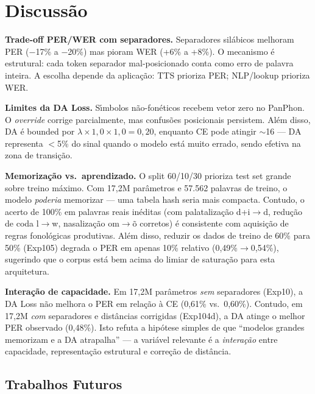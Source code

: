\documentclass[12pt]{article}
\begin{document}
\section{Discuss\~ao}

\textbf{Trade-off PER/WER com separadores.}
Separadores sil\'abicos melhoram PER ($-$17\% a $-$20\%) mas pioram WER
(+6\% a +8\%). O mecanismo \'e estrutural: cada token separador
mal-posicionado conta como erro de palavra inteira. A escolha depende da
aplica\c{c}\~ao: TTS prioriza PER; NLP/lookup prioriza WER.

\textbf{Limites da DA Loss.}
S\'{\i}mbolos n\~ao-fon\'eticos recebem vetor zero no PanPhon. O
\emph{override} corrige parcialmente, mas confus\~oes posicionais
persistem. Al\'em disso, DA \'e bounded por $\lambda \times 1{,}0 \times
1{,}0 = 0{,}20$, enquanto CE pode atingir ${\sim}$16 --- DA representa
$<$5\% do sinal quando o modelo est\'a muito errado, sendo efetiva na
zona de transi\c{c}\~ao.

\textbf{Memoriza\c{c}\~ao vs.\ aprendizado.}
O split 60/10/30 prioriza test set grande sobre treino m\'aximo.
Com 17,2M par\^ametros e 57.562 palavras de treino, o modelo
\emph{poderia} memorizar --- uma tabela hash seria mais compacta.
Contudo, o acerto de 100\% em palavras reais in\'editas (com
palataliza\c{c}\~ao d+i$\to$d, redu\c{c}\~ao de coda
l$\to$w, nasaliza\c{c}\~ao om$\to$\~{o} corretos) \'e consistente
com aquisi\c{c}\~ao de regras fonol\'ogicas produtivas.
Al\'em disso, reduzir os dados de treino de 60\% para 50\% (Exp105)
degrada o PER em apenas 10\% relativo (0,49\%$\to$0,54\%), sugerindo
que o corpus est\'a bem acima do limiar de satura\c{c}\~ao para esta
arquitetura.

\textbf{Intera\c{c}\~ao de capacidade.}
Em 17,2M par\^ametros \emph{sem} separadores (Exp10), a DA Loss n\~ao
melhora o PER em rela\c{c}\~ao \`a CE (0,61\% vs.\ 0,60\%).
Contudo, em 17,2M \emph{com} separadores e dist\^ancias corrigidas
(Exp104d), a DA atinge o melhor PER observado (0,48\%). Isto refuta a
hip\'otese simples de que ``modelos grandes memorizam e a DA
atrapalha'' --- a vari\'avel relevante \'e a \emph{intera\c{c}\~ao}
entre capacidade, representa\c{c}\~ao estrutural e corre\c{c}\~ao de
dist\^ancia.

\subsection{Trabalhos Futuros}
\end{document}
